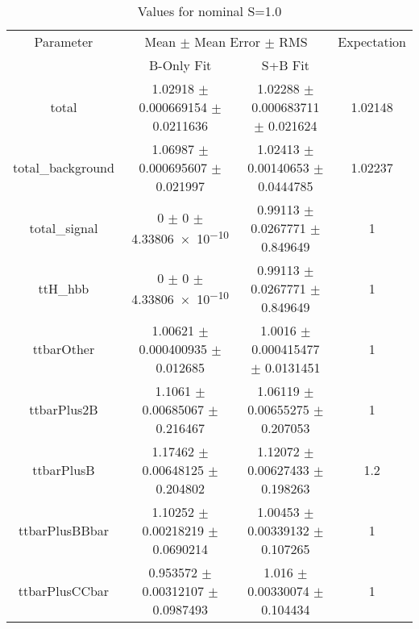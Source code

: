 \begin{table}
\centering
\caption{Values for nominal S=1.0}
\begin{tabular}{cccc}
\toprule
Parameter & \multicolumn{2}{c}{Mean $\pm$ Mean Error $\pm$ RMS} & Expectation\\
 & B-Only Fit & S+B Fit & \\
\midrule
total & \num{1.02918} $\pm$ \num{0.000669154} $\pm$ \num{0.0211636} & \num{1.02288} $\pm$ \num{0.000683711} $\pm$ \num{0.021624} & \num{1.02148}\\
total\_background & \num{1.06987} $\pm$ \num{0.000695607} $\pm$ \num{0.021997} & \num{1.02413} $\pm$ \num{0.00140653} $\pm$ \num{0.0444785} & \num{1.02237}\\
total\_signal & \num{0} $\pm$ \num{0} $\pm$ \num{4.33806e-10} & \num{0.99113} $\pm$ \num{0.0267771} $\pm$ \num{0.849649} & \num{1}\\
ttH\_hbb & \num{0} $\pm$ \num{0} $\pm$ \num{4.33806e-10} & \num{0.99113} $\pm$ \num{0.0267771} $\pm$ \num{0.849649} & \num{1}\\
ttbarOther & \num{1.00621} $\pm$ \num{0.000400935} $\pm$ \num{0.012685} & \num{1.0016} $\pm$ \num{0.000415477} $\pm$ \num{0.0131451} & \num{1}\\
ttbarPlus2B & \num{1.1061} $\pm$ \num{0.00685067} $\pm$ \num{0.216467} & \num{1.06119} $\pm$ \num{0.00655275} $\pm$ \num{0.207053} & \num{1}\\
ttbarPlusB & \num{1.17462} $\pm$ \num{0.00648125} $\pm$ \num{0.204802} & \num{1.12072} $\pm$ \num{0.00627433} $\pm$ \num{0.198263} & \num{1.2}\\
ttbarPlusBBbar & \num{1.10252} $\pm$ \num{0.00218219} $\pm$ \num{0.0690214} & \num{1.00453} $\pm$ \num{0.00339132} $\pm$ \num{0.107265} & \num{1}\\
ttbarPlusCCbar & \num{0.953572} $\pm$ \num{0.00312107} $\pm$ \num{0.0987493} & \num{1.016} $\pm$ \num{0.00330074} $\pm$ \num{0.104434} & \num{1}\\
\bottomrule
\end{tabular}
\end{table}